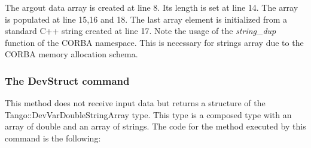 The argout data array is created at line 8. Its length is set at line
14. The array is populated at line 15,16 and 18. The last array element
is initialized from a standard C++ string created at line 17. Note
the usage of the \emph{string\_dup} function of
the CORBA namespace. This is necessary for strings array due to the
CORBA memory allocation schema.

\subsubsection{The DevStruct command}

This method does not receive input data but returns a structure of
the Tango::DevVarDoubleStringArray
type. This type is a composed type with an array of double and an
array of strings. The code for the method executed by this command
is the following:

